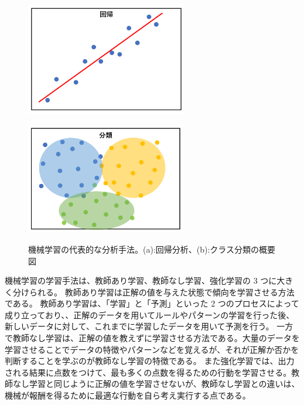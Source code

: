 \begin{figure}[tb]
  \centering
    \begin{minipage}[b]{0.4\linewidth}
        \centering
        \includegraphics[clip, width=7cm]{fig/4/regression.png}
        \vspace{10pt}
        \subcaption{}
        \label{fig:regre}
    \end{minipage}
    \hfill
    \begin{minipage}[b]{0.4\linewidth}
        \centering
        \includegraphics[clip, width=7cm]{fig/4/classification.png}
        \vspace{10pt}
        \subcaption{}
        \label{fig:class}
    \end{minipage}
  \caption{機械学習の代表的な分析手法。(a):回帰分析、(b):クラス分類の概要図}
  \label{fig:fit_def}
\end{figure}

機械学習の学習手法は、教師あり学習、教師なし学習、強化学習の 3 つに大きく分けられる。
教師あり学習は正解の値を与えた状態で傾向を学習させる方法である。
教師あり学習は、「学習」と「予測」といった 2 つのプロセスによって成り立っており、、正解のデータを用いてルールやパターンの学習を行った後、新しいデータに対して、これまでに学習したデータを用いて予測を行う。
一方で教師なし学習は、正解の値を教えずに学習させる方法である。大量のデータを学習させることでデータの特徴やパターンなどを覚えるが、それが正解か否かを判断することを学ぶのが教師なし学習の特徴である。
また強化学習では、出力される結果に点数をつけて、最も多くの点数を得るための行動を学習させる。教師なし学習と同じように正解の値を学習させないが、教師なし学習との違いは、機械が報酬を得るために最適な行動を自ら考え実行する点である。

